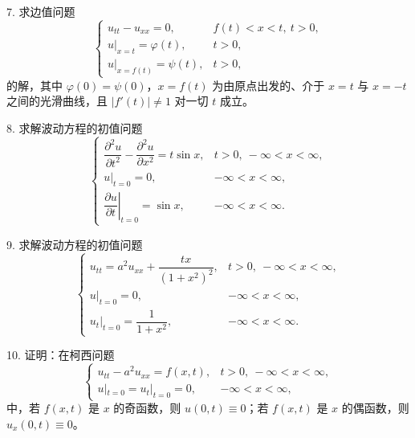 \begin{exercise}
7. 求边值问题
\[
\begin{cases}
u_{tt} - u_{xx} = 0, & f(t)<x<t,\ t>0, \\[6pt]
u|_{x=t} = \varphi(t), & t>0, \\[6pt]
u|_{x=f(t)} = \psi(t), & t>0,
\end{cases}
\]
的解，其中 $\varphi(0)=\psi(0)$，$x=f(t)$ 为由原点出发的、介于 $x=t$ 与 $x=-t$ 之间的光滑曲线，且 $|f'(t)|\neq 1$ 对一切 $t$ 成立。
\end{exercise}

\begin{exercise}
8. 求解波动方程的初值问题
\[
\begin{cases}
\dfrac{\partial^2 u}{\partial t^2} - \dfrac{\partial^2 u}{\partial x^2} = t\sin x, & t>0,\ -\infty<x<\infty, \\[6pt]
u|_{t=0} = 0, & -\infty<x<\infty, \\[6pt]
\left.\dfrac{\partial u}{\partial t}\right|_{t=0} = \sin x, & -\infty<x<\infty.
\end{cases}
\]
\end{exercise}

\begin{exercise}
9. 求解波动方程的初值问题
\[
\begin{cases}
u_{tt} = a^2 u_{xx} + \dfrac{tx}{(1+x^2)^2}, & t>0,\ -\infty<x<\infty, \\[6pt]
u|_{t=0} = 0, & -\infty<x<\infty, \\[6pt]
u_t|_{t=0} = \dfrac{1}{1+x^2}, & -\infty<x<\infty.
\end{cases}
\]
\end{exercise}

\begin{exercise}
10. 证明：在柯西问题
\[
\begin{cases}
u_{tt} - a^2 u_{xx} = f(x,t), & t>0,\ -\infty<x<\infty, \\[6pt]
u|_{t=0} = u_t|_{t=0} = 0, & -\infty<x<\infty,
\end{cases}
\]
中，若 $f(x,t)$ 是 $x$ 的奇函数，则 $u(0,t)\equiv 0$；若 $f(x,t)$ 是 $x$ 的偶函数，则 $u_x(0,t)\equiv 0$。
\end{exercise}
